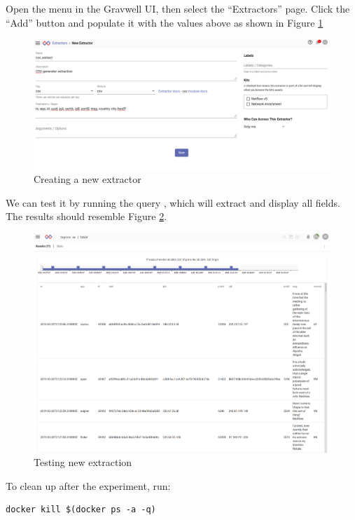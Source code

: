Open the menu in the Gravwell UI, then select the ``Extractors'' page.
Click the ``Add'' button and populate it with the values above as shown in Figure \ref{fig:lab-new-extractor}

\begin{figure}
	\includegraphics{images/new-extractor.png}
	\caption{Creating a new extractor}
	\label{fig:lab-new-extractor}
\end{figure}

We can test it by running the query , which will extract and display all fields. The results should resemble Figure \ref{fig:lab-test-ax}.

\begin{figure}
	\includegraphics{images/lab-test-ax.png}
	\caption{Testing new extraction}
	\label{fig:lab-test-ax}
\end{figure}

To clean up after the experiment, run:

\begin{Verbatim}[breaklines=true]
docker kill $(docker ps -a -q)
\end{Verbatim}



